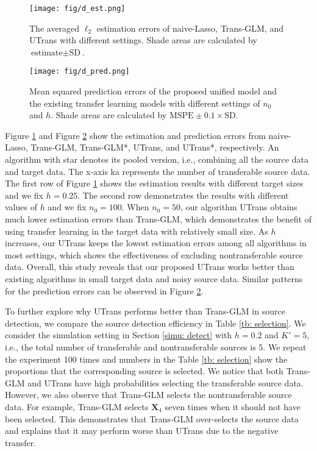 \documentclass[twoside,12pt]{article}
\newcommand{\mb}[1]{\boldsymbol{\mathbf{#1}}}
\begin{document}
\begin{figure}[hbt!]
	\centering
	\texttt{[image: fig/d\_est.png]}
	\caption{The averaged $\ell_2$ estimation errors of naive-Lasso, Trans-GLM, and UTrans with different settings.
		Shade areas are calculated by $\text{estimate}\pm \text{SD}$.}
	\label{fig: detect}
\end{figure}


\begin{figure}[hbt!]
	\centering
	\texttt{[image: fig/d\_pred.png]}
	\caption{Mean squared prediction errors of the proposed unified model and the existing transfer learning models with different settings of $n_0$ and $h$. Shade areas are calculated by $\text{MSPE}\pm 0.1\times \text{SD}$.}
	\label{fig: d_pred}
\end{figure}

Figure \ref{fig: detect} and Figure \ref{fig: d_pred} show the estimation and prediction errors from naive-Lasso, Trans-GLM, Trans-GLM*, UTrans, and UTrans*, respectively.
An algorithm with star denotes its pooled version, i.e., combining all the source data and target data. 
The x-axis ka represents the number of transferable source data.
The first row of Figure \ref{fig: detect} shows the estimation results with different target sizes and we fix $h=0.25$.
The second row demonstrates the results with different values of $h$ and we fix $n_0=100$.
When $n_0=50$, our algorithm UTrans obtains much lower estimation errors than Trans-GLM, which demonstrates the benefit of using transfer learning in the target data with relatively small size.
As $h$ increases, our UTrans keeps the lowest estimation errors among all algorithms in most settings, which shows the effectiveness of excluding nontransferable source data.
Overall, this study reveals that our proposed UTrans works better than existing algorithms in small target data and noisy source data.
Similar patterns for the prediction errors can be observed in Figure \ref{fig: d_pred}.



To further explore why UTrans performs better than Trans-GLM in source detection, we compare the source detection efficiency in Table \ref{tb: selection}.
We consider the simulation setting in Section \ref{simu: detect} with $h=0.2$ and $K'=5$, i.e., the total number of transferable and nontransferable sources is 5. 
We repeat the experiment 100 times and numbers in the Table \ref{tb: selection} show the proportions that the corresponding source is selected.
We notice that both Trans-GLM and UTrans have high probabilities selecting the transferable source data.
However, we also observe that Trans-GLM selects the nontransferable source data.
For example, Trans-GLM selects $\mb X_4$ seven times when it should not have been selected.
This demonstrates that Trans-GLM over-selects the source data and explains that it may perform worse than UTrans due to the negative transfer.
\end{document}
